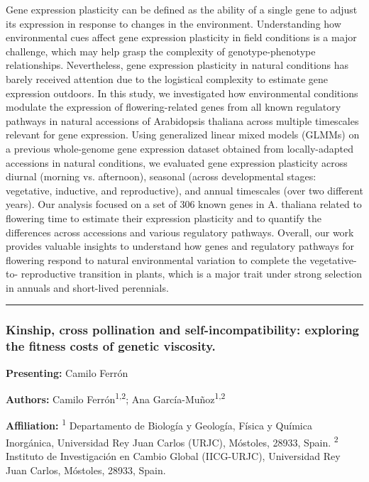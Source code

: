 \documentclass[
  letterpaper,
  DIV=11,
  numbers=noendperiod]{scrartcl}
\begin{document}
Gene expression plasticity can be defined as the ability of a single
gene to adjust its expression in response to changes in the environment.
Understanding how environmental cues affect gene expression plasticity
in field conditions is a major challenge, which may help grasp the
complexity of genotype-phenotype relationships. Nevertheless, gene
expression plasticity in natural conditions has barely received
attention due to the logistical complexity to estimate gene expression
outdoors. In this study, we investigated how environmental conditions
modulate the expression of flowering-related genes from all known
regulatory pathways in natural accessions of Arabidopsis thaliana across
multiple timescales relevant for gene expression. Using generalized
linear mixed models (GLMMs) on a previous whole-genome gene expression
dataset obtained from locally-adapted accessions in natural conditions,
we evaluated gene expression plasticity across diurnal (morning vs.
afternoon), seasonal (across developmental stages: vegetative,
inductive, and reproductive), and annual timescales (over two different
years). Our analysis focused on a set of 306 known genes in A. thaliana
related to flowering time to estimate their expression plasticity and to
quantify the differences across accessions and various regulatory
pathways. Overall, our work provides valuable insights to understand how
genes and regulatory pathways for flowering respond to natural
environmental variation to complete the vegetative-to- reproductive
transition in plants, which is a major trait under strong selection in
annuals and short-lived perennials.

\begin{center}\rule{0.5\linewidth}{0.5pt}\end{center}

\subsubsection{Kinship, cross pollination and self-incompatibility:
exploring the fitness costs of genetic
viscosity.}\label{kinship-cross-pollination-and-self-incompatibility-exploring-the-fitness-costs-of-genetic-viscosity.}

\textbf{Presenting:} Camilo Ferrón

\textbf{Authors:} Camilo Ferrón\textsuperscript{1,2}; Ana
García-Muñoz\textsuperscript{1,2}

\textbf{Affiliation:} \textsuperscript{1} Departamento de Biología y
Geología, Física y Química Inorgánica, Universidad Rey Juan Carlos
(URJC), Móstoles, 28933, Spain. \textsuperscript{2} Instituto de
Investigación en Cambio Global (IICG-URJC), Universidad Rey Juan Carlos,
Móstoles, 28933, Spain.
\end{document}
